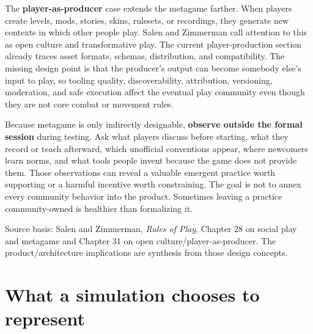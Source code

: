 The \textbf{player-as-producer} case extends the metagame farther. When players create levels, mods, stories, skins, rulesets, or recordings, they generate new contexts in which other people play. Salen and Zimmerman call attention to this as open culture and transformative play. The current player-production section already traces asset formats, schemas, distribution, and compatibility. The missing design point is that the producer's output can become somebody else's input to play, so tooling quality, discoverability, attribution, versioning, moderation, and safe execution affect the eventual play community even though they are not core combat or movement rules.

Because metagame is only indirectly designable, \textbf{observe outside the formal session} during testing. Ask what players discuss before starting, what they record or teach afterward, which unofficial conventions appear, where newcomers learn norms, and what tools people invent because the game does not provide them. Those observations can reveal a valuable emergent practice worth supporting or a harmful incentive worth constraining. The goal is not to annex every community behavior into the product. Sometimes leaving a practice community-owned is healthier than formalizing it.

Source basis: Salen and Zimmerman, \emph{Rules of Play}, Chapter 28 on social play and metagame and Chapter 31 on open culture/player-as-producer. The product/architecture implications are synthesis from those design concepts.

\section{What a simulation chooses to represent}\label{06-engine-ii-ch046-what-a-simulation-chooses-to-represent}

\hypertarget{06-engine-ii-ch046-what-a-simulation-chooses-to-represent}{}

